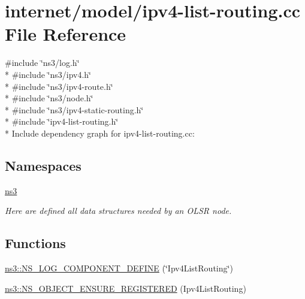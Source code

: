 \hypertarget{ipv4-list-routing_8cc}{}\section{internet/model/ipv4-\/list-\/routing.cc File Reference}
\label{ipv4-list-routing_8cc}
{\ttfamily \#include \char`\"{}ns3/log.\+h\char`\"{}}\\*
{\ttfamily \#include \char`\"{}ns3/ipv4.\+h\char`\"{}}\\*
{\ttfamily \#include \char`\"{}ns3/ipv4-\/route.\+h\char`\"{}}\\*
{\ttfamily \#include \char`\"{}ns3/node.\+h\char`\"{}}\\*
{\ttfamily \#include \char`\"{}ns3/ipv4-\/static-\/routing.\+h\char`\"{}}\\*
{\ttfamily \#include \char`\"{}ipv4-\/list-\/routing.\+h\char`\"{}}\\*
Include dependency graph for ipv4-\/list-\/routing.cc\+:
\subsection*{Namespaces}
\begin{DoxyCompactItemize}
\item 
 \hyperlink{namespacens3}{ns3}
\begin{DoxyCompactList}\small\item\em Here are defined all data structures needed by an O\+L\+SR node. \end{DoxyCompactList}\end{DoxyCompactItemize}
\subsection*{Functions}
\begin{DoxyCompactItemize}
\item 
\hyperlink{namespacens3_a4a0e1125b740846b638718b1c440bf51}{ns3\+::\+N\+S\+\_\+\+L\+O\+G\+\_\+\+C\+O\+M\+P\+O\+N\+E\+N\+T\+\_\+\+D\+E\+F\+I\+NE} (\char`\"{}Ipv4\+List\+Routing\char`\"{})
\item 
\hyperlink{namespacens3_adeb4cec6525c7741b4dfef5b7b856451}{ns3\+::\+N\+S\+\_\+\+O\+B\+J\+E\+C\+T\+\_\+\+E\+N\+S\+U\+R\+E\+\_\+\+R\+E\+G\+I\+S\+T\+E\+R\+ED} (Ipv4\+List\+Routing)
\end{DoxyCompactItemize}
